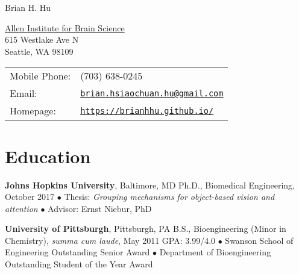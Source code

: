 \documentclass[10pt,letterpaper]{article}
\def\name{Brian H. Hu}
\renewenvironment{itemize}{
  \begin{list}{}{
    \setlength{\leftmargin}{1.5em}
    \setlength{\itemsep}{0.25em}
    \setlength{\parskip}{0pt}
    \setlength{\parsep}{0.25em}
  }
}{
  \end{list}
}
\begin{document}
{\huge \name}


\vspace{0.25in}

\begin{minipage}{0.475\linewidth}
  \href{https://www.alleninstitute.org/what-we-do/brain-science/}{Allen Institute for Brain Science} \\
  615 Westlake Ave N \\
  Seattle, WA 98109
\end{minipage}
\begin{minipage}{0.52\linewidth}
  \begin{tabular}{ll}
    Mobile Phone: & (703) 638-0245 \\
    Email: & \href{mailto:brian.hsiaochuan.hu@gmail.com}{\tt brian.hsiaochuan.hu@gmail.com} \\
    Homepage: & \href{https://brianhhu.github.io/}{\tt https://brianhhu.github.io/} \\
  \end{tabular}
\end{minipage}

\section*{Education}
\vspace{-0.05in}
\begin{itemize}
  \item \textbf{Johns Hopkins University}, Baltimore, MD
  \subitem Ph.D., Biomedical Engineering, October 2017
  \subitem$\bullet$ Thesis: \textit{Grouping mechanisms for object-based vision and attention}
  \subitem$\bullet$ Advisor: Ernst Niebur, PhD
  
  \item \textbf{University of Pittsburgh}, Pittsburgh, PA
  \subitem B.S., Bioengineering (Minor in Chemistry), \textit{summa cum laude}, May 2011
  \subitem GPA: 3.99/4.0
  \vspace{0.05in}
  \subitem$\bullet$ Swanson School of Engineering Outstanding Senior Award
  \subitem$\bullet$ Department of Bioengineering Outstanding Student of the Year Award
\end{itemize}

\vspace{-0.25in}
\end{document}

